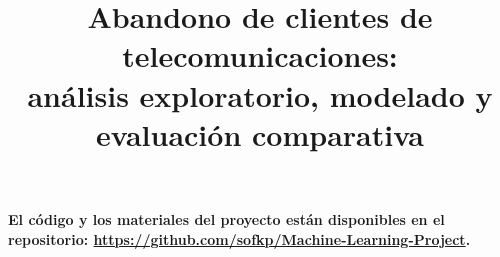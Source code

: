 \documentclass[conference]{IEEEtran}
\title{Abandono de clientes de telecomunicaciones:\\análisis exploratorio, modelado y evaluación comparativa}
\begin{document}
\maketitle














\par \vspace{0.3cm}
\textbf{El código y los materiales del proyecto están disponibles en el repositorio:
\url{https://github.com/sofkp/Machine-Learning-Project}.}
\end{document}
